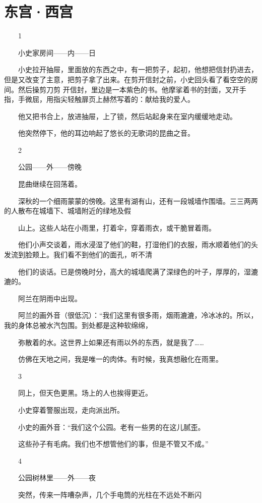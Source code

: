 \chapter{东宫·西宫}

　　1 

　　小史家房间——内——日 

　　小史拉开抽屉，里面放的东西之中，有一把剪子，起初，他想把信封扔进去，但是又改变了主意，把剪子拿了出来。在剪开信封之前，小史回头看了看空空的房间。然后操剪刀剪 开信封，里边是一本紫色的书。他摩挲着书的封面，叉开手指，手微屈，用指尖轻触扉页上赫然写着的：献给我的爱人。 

　　他又把书合上，放进抽屉，上了锁，然后站起身来在室内缓缓地走动。 

　　他突然停下，他的耳边响起了悠长的无歌词的昆曲之音。 

　　2 

　　公园——外——傍晚 

　　昆曲继续在回荡着。 

　　深秋的一个细雨蒙蒙的傍晚。这里有湖有山，还有一段城墙作围墙。三三两两的人散布在城墙下、城墙附近的绿地及假 

　　山上。这些人站在小雨里，打着伞，穿着雨衣，或干脆冒着雨。 

　　他们小声交谈着，雨水浸湿了他们的鞋，打湿他们的衣服，雨水顺着他们的头发流到脸颊上。我们看不到他们的面孔，听不清 

　　他们的谈话。已是傍晚时分，高大的城墙爬满了深绿色的叶子，厚厚的，湿漉漉的。 

　　阿兰在阴雨中出现。 

　　阿兰的画外音（很低沉）：“我们这里有很多雨，烟雨漉漉，冷冰冰的。所以，我的身体总被水汽包围。到处都是这种软绵绵， 

　　弥散着的水。这世界上如果还有雨以外的东西，就是我了…… 

　　仿佛在天地之间，我是唯一的肉体。有时候，我真想融化在雨里。 

　　3 

　　同上，但天色更黑。场上的人也挨得更近。 

　　小史穿着警服出现，走向派出所。 

　　小史的画外音：“我们这个公园。老有一些男的在这儿腻歪。 

　　这些孙子有毛病。我们也不想管他们的事，但是不管又不成。” 

　　4 

　　公园树林里——外——夜 

　　突然，传来一阵嘈杂声，几个手电筒的光柱在不远处不断闪 

